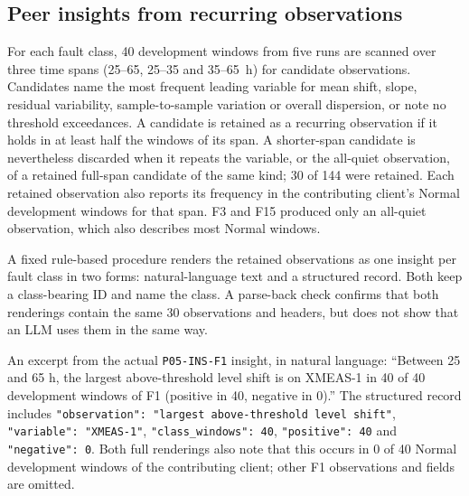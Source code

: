 \documentclass[conference]{IEEEtran}
\begin{document}
\subsection{Peer insights from recurring observations}
For each fault class, 40 development windows from five runs are scanned over three time spans (25--65, 25--35 and 35--65~h) for candidate observations. Candidates name the most frequent leading variable for mean shift, slope, residual variability, sample-to-sample variation or overall dispersion, or note no threshold exceedances. A candidate is retained as a recurring observation if it holds in at least half the windows of its span. A shorter-span candidate is nevertheless discarded when it repeats the variable, or the all-quiet observation, of a retained full-span candidate of the same kind; 30 of 144 were retained. Each retained observation also reports its frequency in the contributing client's Normal development windows for that span. F3 and F15 produced only an all-quiet observation, which also describes most Normal windows.

A fixed rule-based procedure renders the retained observations as one insight per fault class in two forms: natural-language text and a structured record. Both keep a class-bearing ID and name the class. A parse-back check confirms that both renderings contain the same 30 observations and headers, but does not show that an LLM uses them in the same way.

An excerpt from the actual \texttt{P05-INS-F1} insight, in natural language: ``Between 25 and 65 h, the largest above-threshold level shift is on XMEAS-1 in 40 of 40 development windows of F1 (positive in 40, negative in 0).'' The structured record includes \texttt{"observation": "largest above-threshold level shift"}, \texttt{"variable": "XMEAS-1"}, \texttt{"class\_windows": 40}, \texttt{"positive": 40} and \texttt{"negative": 0}. Both full renderings also note that this occurs in 0 of 40 Normal development windows of the contributing client; other F1 observations and fields are omitted.
\end{document}
